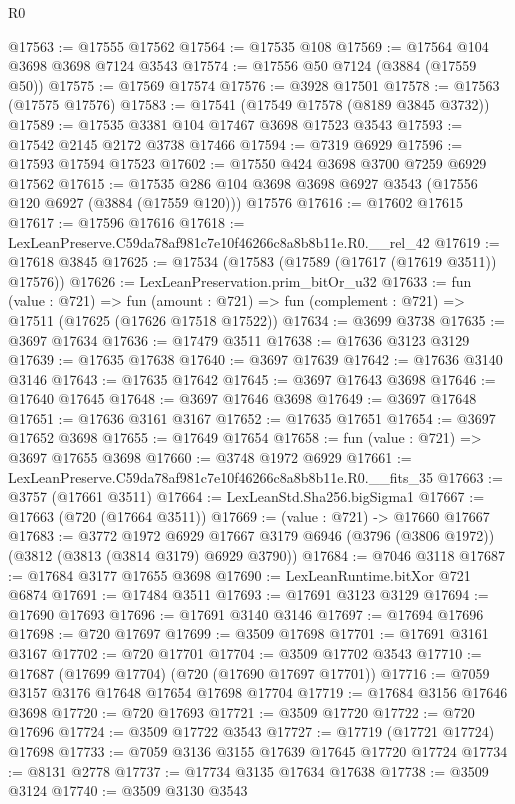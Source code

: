 \begin{lexlean}{R0}
\begin{coremodule}
@17563 := @17555 @17562
@17564 := @17535 @108
@17569 := @17564 @104 @3698 @3698 @7124 @3543
@17574 := @17556 @50 @7124 (@3884 (@17559 @50))
@17575 := @17569 @17574
@17576 := @3928 @17501
@17578 := @17563 (@17575 @17576)
@17583 := @17541 (@17549 @17578 (@8189 @3845 @3732))
@17589 := @17535 @3381 @104 @17467 @3698 @17523 @3543
@17593 := @17542 @2145 @2172 @3738 @17466
@17594 := @7319 @6929
@17596 := @17593 @17594 @17523
@17602 := @17550 @424 @3698 @3700 @7259 @6929 @17562
@17615 := @17535 @286 @104 @3698 @3698 @6927 @3543 (@17556 @120 @6927 (@3884 (@17559 @120))) @17576
@17616 := @17602 @17615
@17617 := @17596 @17616
@17618 := LexLeanPreserve.C59da78af981c7e10f46266c8a8b8b11e.R0.__rel_42
@17619 := @17618 @3845
@17625 := @17534 (@17583 (@17589 (@17617 (@17619 @3511)) @17576))
@17626 := LexLeanPreservation.prim_bitOr_u32
@17633 := fun (value : @721) =>
  fun (amount : @721) => fun (complement : @721) => @17511 (@17625 (@17626 @17518 @17522))
@17634 := @3699 @3738
@17635 := @3697 @17634
@17636 := @17479 @3511
@17638 := @17636 @3123 @3129
@17639 := @17635 @17638
@17640 := @3697 @17639
@17642 := @17636 @3140 @3146
@17643 := @17635 @17642
@17645 := @3697 @17643 @3698
@17646 := @17640 @17645
@17648 := @3697 @17646 @3698
@17649 := @3697 @17648
@17651 := @17636 @3161 @3167
@17652 := @17635 @17651
@17654 := @3697 @17652 @3698
@17655 := @17649 @17654
@17658 := fun (value : @721) => @3697 @17655 @3698
@17660 := @3748 @1972 @6929
@17661 := LexLeanPreserve.C59da78af981c7e10f46266c8a8b8b11e.R0.__fits_35
@17663 := @3757 (@17661 @3511)
@17664 := LexLeanStd.Sha256.bigSigma1
@17667 := @17663 (@720 (@17664 @3511))
@17669 := (value : @721) -> @17660 @17667
@17683 := @3772
    @1972
    @6929
    @17667
    @3179
    @6946
    (@3796 (@3806 @1972))
    (@3812 (@3813 (@3814 @3179) @6929 @3790))
@17684 := @7046 @3118
@17687 := @17684 @3177 @17655 @3698
@17690 := LexLeanRuntime.bitXor @721 @6874
@17691 := @17484 @3511
@17693 := @17691 @3123 @3129
@17694 := @17690 @17693
@17696 := @17691 @3140 @3146
@17697 := @17694 @17696
@17698 := @720 @17697
@17699 := @3509 @17698
@17701 := @17691 @3161 @3167
@17702 := @720 @17701
@17704 := @3509 @17702 @3543
@17710 := @17687 (@17699 @17704) (@720 (@17690 @17697 @17701))
@17716 := @7059 @3157 @3176 @17648 @17654 @17698 @17704
@17719 := @17684 @3156 @17646 @3698
@17720 := @720 @17693
@17721 := @3509 @17720
@17722 := @720 @17696
@17724 := @3509 @17722 @3543
@17727 := @17719 (@17721 @17724) @17698
@17733 := @7059 @3136 @3155 @17639 @17645 @17720 @17724
@17734 := @8131 @2778
@17737 := @17734 @3135 @17634 @17638
@17738 := @3509 @3124
@17740 := @3509 @3130 @3543

\end{coremodule}
\end{lexlean}
